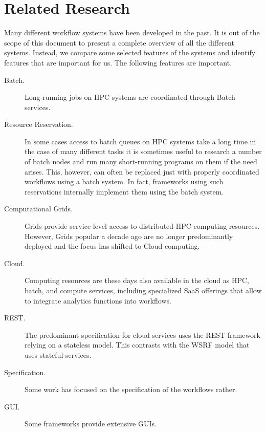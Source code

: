 
\section{Related Research}

Many different workflow systems have been developed in the past. It
is out of the scope of this document to present a complete overview of all
the different systems. Instead, we compare some selected features of
the systems and identify features that are important for us. The
following features are important.

\begin{description}

\item[Batch.] Long-running jobs on HPC systems are coordinated through Batch services.

\item[Resource Reservation.] In some cases access to batch queues on HPC systems take a long time in the case of many different tasks it is sometimes useful to research a number of batch nodes and run many short-running programs on them if the need arises. This, however, can often be replaced just with properly coordinated workflows using a batch system. In fact, frameworks using such reservations internally implement them using the batch system.

\item[Computational Grids.] Grids provide service-level access to distributed HPC computing resources. However, Grids popular a decade ago are no longer predominantly deployed and the focus has shifted to Cloud computing.

\item[Cloud.] Computing resources are these days also available in the cloud as HPC, batch, and compute services, including specialized SaaS offerings that allow to integrate analytics functions into workflows.

\item[REST.] The predominant specification for cloud services uses the REST framework relying on a stateless model. This contrasts with the WSRF model that uses stateful services.

\item[Specification.] Some work has focused on the specification of the workflows rather.

\item[GUI.] Some frameworks provide extensive GUIs.

\end{description}

